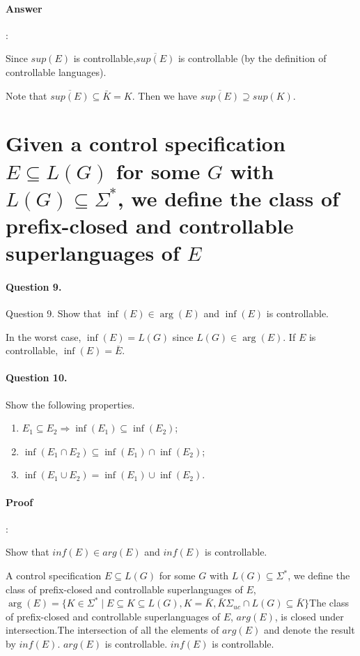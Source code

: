 \documentclass{article}
\begin{document}
\paragraph{Answer}:

Since $sup(E)$ is controllable,$ \overline{sup(E)}$ is controllable (by the definition of controllable languages).

Note that $ \overline{sup(E)} \subseteq \bar{K} = K$. Then we have $\overline{sup(E)} \supseteq sup (K)$.


\section{Given a control specification $E \subseteq L(G)$ for some $G$ with $L(G) \subseteq \Sigma^*$, we define the class of prefix-closed and controllable superlanguages of $E$}

\paragraph{Question 9.} Question 9. Show that $\inf (E) \in \arg (E)$ and $\inf (E)$ is controllable.

In the worst case, $\inf (E)=L(G)$ since $L(G) \in \arg (E)$. If $E$ is controllable, $\inf (E)=\bar{E}$.

\paragraph{Question 10.} Show the following properties.

\begin{enumerate}
  \item  $E_1 \subseteq E_2 \Longrightarrow \inf \left(E_1\right) \subseteq \inf \left(E_2\right)$;
  \item $\inf \left(E_1 \cap E_2\right) \subseteq \inf \left(E_1\right) \cap \inf \left(E_2\right)$;
  \item $\inf \left(E_1 \cup E_2\right)=\inf \left(E_1\right) \cup \inf \left(E_2\right)$.
\end{enumerate}

\paragraph{Proof}:

Show that $inf(E) \in arg(E)$ and $inf(E)$ is controllable.

A control specification $E \subseteq L(G)$ for some $G$ with $L(G) \subseteq \Sigma^*$, we define the class of prefix-closed and controllable superlanguages of $E$, $\arg (E) = \{K \in \Sigma^* \mid E \subseteq K \subseteq L(G), K = \bar{K}, \bar{K}\Sigma_{uc} \cap L(G) \subseteq \bar{K}\}$The class of prefix-closed and controllable superlanguages of $E$, $arg(E)$, is closed under intersection.The intersection of all the elements of $arg(E)$ and denote the result by $inf(E)$. $arg(E)$ is controllable. $inf(E)$ is controllable.
\end{document}
